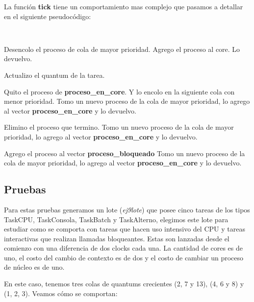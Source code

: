 La función \textbf{tick} tiene un comportamiento mas complejo que pasamos a detallar en el siguiente pseudocódigo:

~

\begin{algorithmic}

		\State Desencolo el proceso de cola de mayor prioridad.
		\State Agrego el proceso al core.
		\State Lo devuelvo.
		
	
		\State Actualizo el quantum de la tarea.

			\State Quito el proceso de \textbf{proceso\_en\_core}. Y lo encolo en la siguiente cola con menor prioridad.
			\State Tomo un nuevo proceso de la cola de mayor prioridad, lo agrego al vector \textbf{proceso\_en\_core} y lo devuelvo.
		\EndIf

		\State Elimino el proceso que termino.
		\State Tomo un nuevo proceso de la cola de mayor prioridad, lo agrego al vector \textbf{proceso\_en\_core} y lo devuelvo.

		\State Agrego el proceso al vector \textbf{proceso\_bloqueado}
		\State Tomo un nuevo proceso de la cola de mayor prioridad, lo agrego al vector \textbf{proceso\_en\_core} y lo devuelvo.
	
	\EndIf
\EndFunction	
\end{algorithmic}

\subsection{Pruebas}

Para estas pruebas generamos un lote (\textit{ej9lote}) que posee cinco tareas de los tipos TaskCPU, TaskConsola, TaskBatch y TaskAlterno, elegimos este lote para estudiar como se comporta con tareas que hacen uso intensivo del CPU y tareas interactivas que realizan llamadas bloqueantes. Estas son lanzadas desde el comienzo con una diferencia de dos clocks cada una. La cantidad de cores es de uno, el costo del cambio de contexto es de dos y el costo de cambiar un proceso de núcleo es de uno.

En este caso, tenemos tres colas de quantums crecientes (2, 7 y 13), (4, 6 y 8) y (1, 2, 3). Veamos cómo se comportan:

